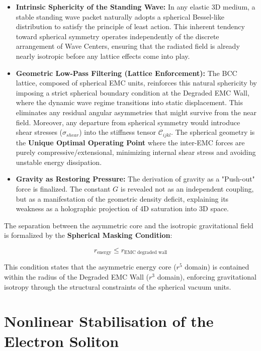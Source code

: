 \documentclass[10pt,a4paper]{article}
\begin{document}
\begin{itemize}
	\item \textbf{Intrinsic Sphericity of the Standing Wave:} 
	In any elastic 3D medium, a stable standing wave packet naturally adopts a spherical Bessel-like distribution to satisfy the principle of least action. This inherent tendency toward spherical symmetry operates independently of the discrete arrangement of Wave Centers, ensuring that the radiated field is already nearly isotropic before any lattice effects come into play.
	
	\item \textbf{Geometric Low-Pass Filtering (Lattice Enforcement):} 
	The BCC lattice, composed of spherical EMC units, reinforces this natural sphericity by imposing a strict spherical boundary condition at the Degraded EMC Wall, where the dynamic wave regime transitions into static displacement. This eliminates any residual angular asymmetries that might survive from the near field. Moreover, any departure from spherical symmetry would introduce shear stresses ($\sigma_{shear}$) into the stiffness tensor $\mathcal{C}_{ijkl}$. The spherical geometry is the \textbf{Unique Optimal Operating Point} where the inter-EMC forces are purely compressive/extensional, minimizing internal shear stress and avoiding unstable energy dissipation.
	
	\item \textbf{Gravity as Restoring Pressure:} 
	The derivation of gravity as a "Push-out" force is finalized. The constant $G$ is revealed not as an independent coupling, but as a manifestation of the geometric density deficit, explaining its weakness as a holographic projection of 4D saturation into 3D space.
\end{itemize}

The separation between the asymmetric core and the isotropic gravitational field is formalized by the \textbf{Spherical Masking Condition}:

\begin{equation}
	r_{\text{energy}} \le r_{\text{EMC degraded wall}}
	\label{eq:radius_masking}
\end{equation}

This condition states that the asymmetric energy core ($r^5$ domain) is contained within the radius of the Degraded EMC Wall ($r^3$ domain), enforcing gravitational isotropy through the structural constraints of the spherical vacuum units.

\section{Nonlinear Stabilisation of the Electron Soliton}
\label{sec:nonlinear_stability}
\end{document}
